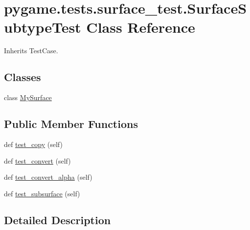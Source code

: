 \hypertarget{classpygame_1_1tests_1_1surface__test_1_1_surface_subtype_test}{}\section{pygame.\+tests.\+surface\+\_\+test.\+Surface\+Subtype\+Test Class Reference}
\label{classpygame_1_1tests_1_1surface__test_1_1_surface_subtype_test}


Inherits Test\+Case.

\subsection*{Classes}
\begin{DoxyCompactItemize}
\item 
class \hyperlink{classpygame_1_1tests_1_1surface__test_1_1_surface_subtype_test_1_1_my_surface}{My\+Surface}
\end{DoxyCompactItemize}
\subsection*{Public Member Functions}
\begin{DoxyCompactItemize}
\item 
def \hyperlink{classpygame_1_1tests_1_1surface__test_1_1_surface_subtype_test_ab7de3c2fd97612dd92a417d44b0b88f2}{test\+\_\+copy} (self)
\item 
def \hyperlink{classpygame_1_1tests_1_1surface__test_1_1_surface_subtype_test_af1d178775f22e1a04aaf2900c7f9f266}{test\+\_\+convert} (self)
\item 
def \hyperlink{classpygame_1_1tests_1_1surface__test_1_1_surface_subtype_test_af045573706beb7fbefabbf6493818025}{test\+\_\+convert\+\_\+alpha} (self)
\item 
def \hyperlink{classpygame_1_1tests_1_1surface__test_1_1_surface_subtype_test_ae79bff683e2fd610bb550d2d4e242bf4}{test\+\_\+subsurface} (self)
\end{DoxyCompactItemize}


\subsection{Detailed Description}
 

